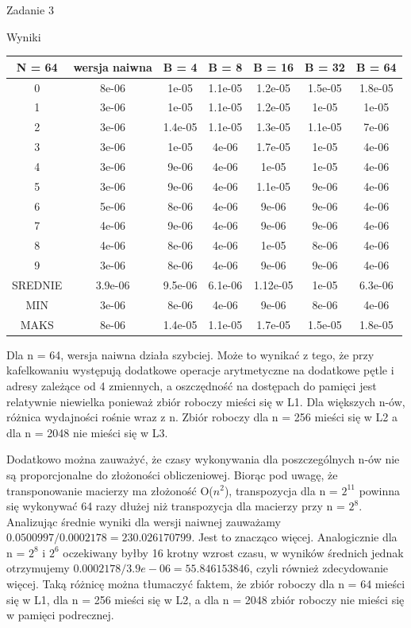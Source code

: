 \documentclass[11pt,wide]{mwart}
\begin{document}
\begin{section}{Zadanie 3}
\begin{subsection}{Wyniki}
\begin{center}
\begin{tabular}{|c|c|c|c|c|c|c|}
\hline
N = 64 &wersja naiwna & B = 4 & B = 8 & B = 16 & B = 32 & B = 64\\
\hline
0 & 8e-06 & 1e-05 & 1.1e-05 & 1.2e-05 & 1.5e-05 & 1.8e-05\\
\hline
1 & 3e-06 & 1e-05 & 1.1e-05 & 1.2e-05 & 1e-05 & 1e-05\\
\hline
2 & 3e-06 & 1.4e-05 & 1.1e-05 & 1.3e-05 & 1.1e-05 & 7e-06\\
\hline
3 & 3e-06 & 1e-05 & 4e-06 & 1.7e-05 & 1e-05 & 4e-06\\
\hline
4 & 3e-06 & 9e-06 & 4e-06 & 1e-05 & 1e-05 & 4e-06\\
\hline
5 & 3e-06 & 9e-06 & 4e-06 & 1.1e-05 & 9e-06 & 4e-06\\
\hline
6 & 5e-06 & 8e-06 & 4e-06 & 9e-06 & 9e-06 & 4e-06\\
\hline
7 & 4e-06 & 9e-06 & 4e-06 & 9e-06 & 9e-06 & 4e-06\\
\hline
8 & 4e-06 & 8e-06 & 4e-06 & 1e-05 & 8e-06 & 4e-06\\
\hline
9 & 3e-06 & 8e-06 & 4e-06 & 9e-06 & 9e-06 & 4e-06\\
\hline
SREDNIE & 3.9e-06 & 9.5e-06 & 6.1e-06 & 1.12e-05 & 1e-05 & 6.3e-06\\
\hline
MIN & 3e-06 & 8e-06 & 4e-06 & 9e-06 & 8e-06 & 4e-06\\
\hline
MAKS & 8e-06 & 1.4e-05 & 1.1e-05 & 1.7e-05 & 1.5e-05 & 1.8e-05\\
\hline
\end{tabular}
\end{center}

Dla n = 64, wersja naiwna działa szybciej. Może to wynikać z tego, że przy kafelkowaniu występują dodatkowe operacje arytmetyczne na dodatkowe pętle i adresy zależące od 4 zmiennych, a oszczędność na dostępach do pamięci jest relatywnie niewielka ponieważ zbiór roboczy mieści się w L1. Dla większych n-ów, różnica wydajności rośnie wraz z n. Zbiór roboczy dla n = 256 mieści się w L2 a dla n = 2048 nie mieści się w L3. 

Dodatkowo można zauważyć, że czasy wykonywania dla poszczególnych n-ów nie są proporcjonalne do złożoności obliczeniowej. 
Biorąc pod uwagę, że transponowanie macierzy ma złożoność O(\(n^2\)), transpozycja dla n = \(2^{11}\) powinna się wykonywać 64 razy dłużej niż transpozycja dla macierzy przy n = \(2^8\). Analizując średnie wyniki dla wersji naiwnej zauważamy \(0.0500997 / 0.0002178 = 230.026170799\). Jest to znacząco więcej. Analogicznie dla n = \(2^8\) i \(2^6\) oczekiwany byłby 16 krotny wzrost czasu, w wyników średnich jednak otrzymujemy \(0.0002178/3.9e-06 = 55.846153846\), czyli również zdecydowanie więcej. Taką różnicę można tłumaczyć faktem, że zbiór roboczy dla n = 64 mieści się w L1, dla n = 256 mieści się w L2, a dla n = 2048 zbiór roboczy nie mieści się w pamięci podrecznej.

\end{subsection}
 
 \end{section}
 
\end{document}
